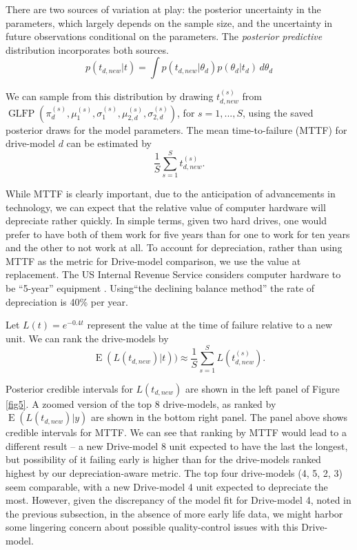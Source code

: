 \documentclass[aap]{imsart}
\newcommand{\op}{\operatorname}
\begin{document}
There are two sources of variation at play: the
posterior uncertainty in the parameters, which largely depends on the
sample size, and the uncertainty in future
observations conditional on the parameters. The {\em posterior
  predictive} distribution incorporates both sources.
\begin{equation*}
  p(t_{d,new}|t) = \int p(t_{d,new}|\theta_d) p(\theta_d|t_d) \, d\theta_d
\end{equation*}

We can sample from this distribution by drawing $t_{d,new}^{(s)}$ from
$\operatorname{GLFP}(\pi_d^{(s)},
\mu_1^{(s)},\sigma_1^{(s)},\mu_{2,d}^{(s)},\sigma_{2,d}^{(s)})$, for
$s=1,...,S$, using the saved posterior draws for the model
parameters. The mean time-to-failure (MTTF) for drive-model $d$ can be estimated by
$$\frac{1}{S} \sum_{s=1}^{S} t_{d,new}^{(s)}.$$

While MTTF is clearly important, due to the
anticipation of advancements in technology, we can expect that the
relative value of computer hardware will depreciate rather quickly. In simple terms, given two hard drives, one would prefer to have both of them work for five years than for one to work for ten years and the other to not work at all. To account
for depreciation, rather than using MTTF as the metric for Drive-model comparison, we use the value at replacement. The US Internal Revenue Service considers
computer hardware to be ``5-year'' equipment \citep{f4562}. Using``the declining
balance method'' the rate of depreciation is 40\% per year.

Let $L(t) = e^{-0.4t}$ represent the value at the time of failure
relative to a new unit. We can rank the drive-models by 
$$\op{E}(L(t_{d,new})|t))\approx \frac{1}{S} \sum_{s=1}^{S} L(t_{d,new}^{(s)}).$$

Posterior credible intervals for $L(t_{d,new})$ are shown in the left panel of Figure \ref{fig5}. A zoomed version of the top 8 drive-models, as ranked by $\op{E}(L(t_{d,new})|y)$ are shown in the bottom right panel. The panel above shows credible intervals for MTTF. We can see that ranking by MTTF would lead to a different result -- a new Drive-model 8 unit expected to have the last the longest, but possibility of it failing early is higher than for the drive-models ranked highest by our depreciation-aware metric. The top four drive-models (4, 5, 2, 3) seem comparable, with a new Drive-model 4 unit expected to depreciate the most. However, given the discrepancy of the model fit for Drive-model 4, noted in the previous subsection, in the absence of more early life data, we might harbor some lingering concern about possible quality-control issues with this Drive-model.
\end{document}
